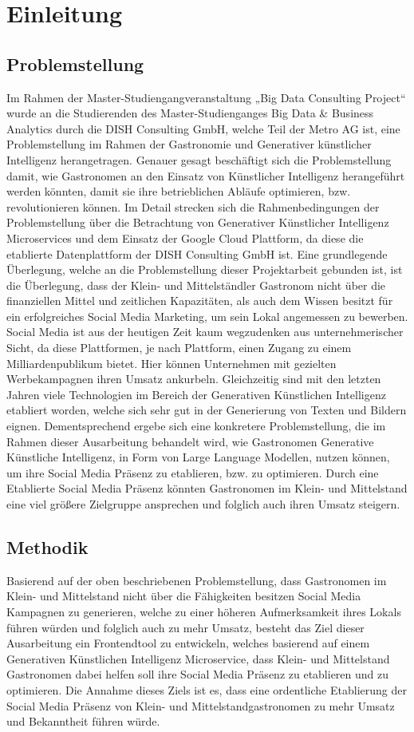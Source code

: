 \section{Einleitung}
\subsection{Problemstellung}
Im Rahmen der Master-Studiengangveranstaltung „Big Data Consulting Project“ wurde an die Studierenden des Master-Studienganges Big Data \& Business Analytics durch die DISH Consulting GmbH, welche Teil der Metro AG ist, eine Problemstellung im Rahmen der Gastronomie und Generativer künstlicher Intelligenz herangetragen.
Genauer gesagt beschäftigt sich die Problemstellung damit, wie Gastronomen an den Einsatz von Künstlicher Intelligenz herangeführt werden könnten, damit sie ihre betrieblichen Abläufe optimieren, bzw. revolutionieren können.
Im Detail strecken sich die Rahmenbedingungen der Problemstellung über die Betrachtung von Generativer Künstlicher Intelligenz Microservices und dem Einsatz der Google Cloud Plattform, da diese die etablierte Datenplattform der DISH Consulting GmbH ist.
Eine grundlegende Überlegung, welche an die Problemstellung dieser Projektarbeit gebunden ist, ist die Überlegung, dass der Klein- und Mittelständler Gastronom nicht über die finanziellen Mittel und zeitlichen Kapazitäten, als auch dem Wissen besitzt für ein erfolgreiches Social Media Marketing, um sein Lokal angemessen zu bewerben.
Social Media ist aus der heutigen Zeit kaum wegzudenken aus unternehmerischer Sicht, da diese Plattformen, je nach Plattform, einen Zugang zu einem Milliardenpublikum bietet.
Hier können Unternehmen mit gezielten Werbekampagnen ihren Umsatz ankurbeln.
Gleichzeitig sind mit den letzten Jahren viele Technologien im Bereich der Generativen Künstlichen Intelligenz etabliert worden, welche sich sehr gut in der Generierung von Texten und Bildern eignen.
Dementsprechend ergebe sich eine konkretere Problemstellung, die im Rahmen dieser Ausarbeitung behandelt wird, wie Gastronomen Generative Künstliche Intelligenz, in Form von Large Language Modellen, nutzen können, um ihre Social Media Präsenz zu etablieren, bzw. zu optimieren.
Durch eine Etablierte Social Media Präsenz könnten Gastronomen im Klein- und Mittelstand eine viel größere Zielgruppe ansprechen und folglich auch ihren Umsatz steigern.

\subsection{Methodik}
Basierend auf der oben beschriebenen Problemstellung, dass Gastronomen im Klein- und Mittelstand nicht über die Fähigkeiten besitzen Social Media Kampagnen zu generieren, welche zu einer höheren Aufmerksamkeit ihres Lokals führen würden und folglich auch zu mehr Umsatz, besteht das Ziel dieser Ausarbeitung ein Frontendtool zu entwickeln, welches basierend auf einem Generativen Künstlichen Intelligenz Microservice, dass Klein- und Mittelstand Gastronomen dabei helfen soll ihre Social Media Präsenz zu etablieren und zu optimieren.
Die Annahme dieses Ziels ist es, dass eine ordentliche Etablierung der Social Media Präsenz von Klein- und Mittelstandgastronomen zu mehr Umsatz und Bekanntheit führen würde.


